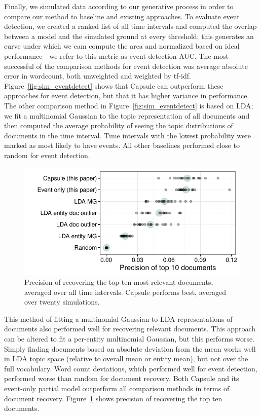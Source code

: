 Finally, we simulated data according to our generative process in order to compare our method to baseline and existing approaches.  
To evaluate event detection, we created a ranked list of all time intervals and computed the overlap between a model and the simulated ground at every threshold; this generates an curve under which we cam compute the area and normalized based on ideal performance---we refer to this metric as event detection AUC.  
The most successful of the comparison methods for event detection was average absolute error in wordcount, both unweighted and weighted by tf-idf.  Figure~\ref{fig:sim_eventdetect} shows that Capsule can outperform these approaches for event detection, but that it has higher variance in performance.  The other comparison method in Figure~\ref{fig:sim_eventdetect} is based on LDA; we fit a multinomial Gaussian to the topic representation of all documents and then computed the average probability of seeing the topic distributions of documents in the time interval.  Time intervals with the lowest probability were marked as most likely to have events.  All other baselines performed close to random for event detection.
\begin{figure}[h]
\centering
\includegraphics[width=\linewidth]{fig/precision10.pdf}
\caption{Precision of recovering the top ten most relevant documents, averaged over all time intervals.  Capsule performs best, averaged over twenty simulations.}
\label{fig:sim_precision}
\end{figure}

This method of fitting a multinomial Gaussian to LDA representations of documents also performed well for recovering relevant documents.  This approach can be altered to fit a per-entity multinomial Gaussian, but this performs worse.  Simply finding documents based on absolute deviation from the mean works well in LDA topic space (relative to overall mean or entity mean), but not over the full vocabulary.  Word count deviations, which performed well for event detection, performed worse than random for document recovery.  Both Capsule and its event-only partial model outperform all comparison methods in terms of document recovery.  Figure~\ref{fig:sim_precision} shows precision of recovering the top ten documents.

